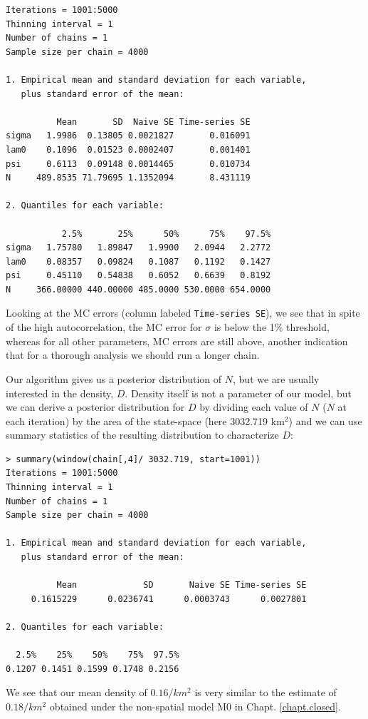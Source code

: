 \begin{verbatim}
Iterations = 1001:5000
Thinning interval = 1
Number of chains = 1
Sample size per chain = 4000

1. Empirical mean and standard deviation for each variable,
   plus standard error of the mean:

          Mean       SD  Naive SE Time-series SE
sigma   1.9986  0.13805 0.0021827       0.016091
lam0    0.1096  0.01523 0.0002407       0.001401
psi     0.6113  0.09148 0.0014465       0.010734
N     489.8535 71.79695 1.1352094       8.431119

2. Quantiles for each variable:

           2.5%       25%      50%      75%    97.5%
sigma   1.75780   1.89847   1.9900   2.0944   2.2772
lam0    0.08357   0.09824   0.1087   0.1192   0.1427
psi     0.45110   0.54838   0.6052   0.6639   0.8192
N     366.00000 440.00000 485.0000 530.0000 654.0000
\end{verbatim}

Looking at the MC errors (column labeled \mbox{\tt Time-series SE}), 
we see that in spite of the high autocorrelation, the MC error for 
$\sigma$ is below the 1\% threshold, whereas for all other parameters, 
MC errors are still above, another indication that for a thorough 
analysis we should run a longer chain.

Our algorithm gives us a posterior distribution of $N$, but we are usually 
interested in the density, $D$. Density itself is not a parameter of our 
model, but we can derive a posterior distribution for $D$ by dividing 
each value of $N$ ($N$ at each iteration) by the area of the state-space
 (here 3032.719 km$^2$) and we can use summary statistics of the 
 resulting distribution to characterize $D$:
\begin{verbatim}
> summary(window(chain[,4]/ 3032.719, start=1001))
Iterations = 1001:5000
Thinning interval = 1
Number of chains = 1
Sample size per chain = 4000

1. Empirical mean and standard deviation for each variable,
   plus standard error of the mean:

          Mean             SD       Naive SE Time-series SE
     0.1615229      0.0236741      0.0003743      0.0027801

2. Quantiles for each variable:

  2.5%    25%    50%    75%  97.5%
0.1207 0.1451 0.1599 0.1748 0.2156
\end{verbatim}
We see that our mean density of $0.16/km^2$ is very similar to the estimate of $0.18/km^2$ obtained under the non-spatial model M0 in Chapt. \ref{chapt.closed}.


